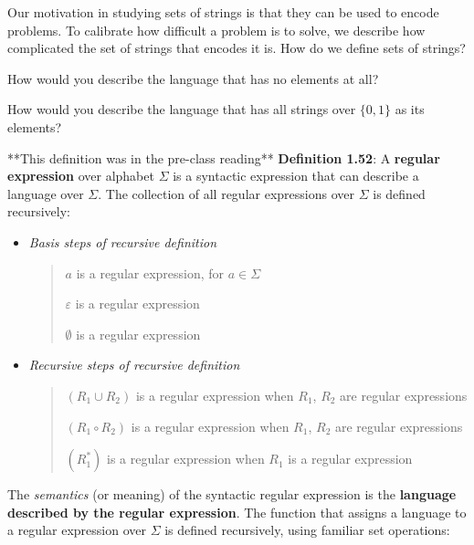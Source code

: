 \documentclass[12pt, oneside]{article}
\begin{document}
Our motivation in studying sets of strings is that they can be used to encode problems.
To calibrate how difficult a problem is to solve, we describe how complicated the set of strings that encodes it is. 
How do we define sets of strings?


\vfill

How would you describe the language that has no elements at all?

\vfill

How would you describe the language that has all strings over $\{0,1\}$ as its elements?

\vfill

\newpage

**This definition was in the pre-class reading**
{\bf Definition 1.52}: A {\bf regular expression} over alphabet $\Sigma$
is a syntactic expression that can describe a language over $\Sigma$. The collection of all regular
expressions over $\Sigma$ is defined recursively:
\begin{itemize}
\item[] {\it Basis steps of recursive definition}
\begin{quote}    
    $a$ is a regular expression, for $a \in \Sigma$

    $\varepsilon$ is a regular expression

    $\emptyset$ is a regular expression
\end{quote}

\item[] {\it Recursive steps of recursive definition}
\begin{quote}
    $(R_1 \cup R_2)$ is a regular expression when $R_1$, $R_2$ are regular expressions 

    $(R_1 \circ R_2)$ is a regular expression when $R_1$, $R_2$ are regular expressions

    $(R_1^*)$ is a regular expression when $R_1$ is a regular expression 
\end{quote}
\end{itemize}
 

The {\it semantics} (or meaning) of the syntactic regular expression is the {\bf language
described by the regular expression}. The function that assigns a language to a regular expression
over $\Sigma$ is defined recursively, using familiar set operations:
\end{document}
